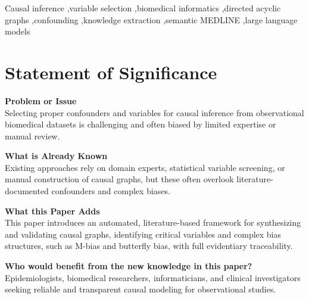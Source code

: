 \documentclass[preprint,12pt,numbers,sort&compress]{elsarticle}
\begin{document}
\begin{frontmatter}
\begin{abstract}
\textbf{Conclusions:} CausalKnowledgeTrace provides a scalable, evidence-based approach to causal graph construction that systematically identifies confounders and bias structures often missed by conventional approaches. The Python-Django architecture enables both standalone analysis and integration into larger computational workflows, representing a significant advance in computational support for causal inference in biomedical research.
\end{abstract}

\begin{keyword}
Causal inference \sep variable selection \sep biomedical informatics \sep directed acyclic graphs \sep confounding \sep knowledge extraction \sep semantic MEDLINE \sep large language models

\end{keyword}

\end{frontmatter}


\section*{Statement of Significance}

\noindent\textbf{Problem or Issue}\\
Selecting proper confounders and variables for causal inference from observational biomedical datasets is challenging and often biased by limited expertise or manual review.

\noindent\textbf{What is Already Known}\\
Existing approaches rely on domain experts, statistical variable screening, or manual construction of causal graphs, but these often overlook literature-documented confounders and complex biases.

\noindent\textbf{What this Paper Adds}\\
This paper introduces an automated, literature-based framework for synthesizing and validating causal graphs, identifying critical variables and complex bias structures, such as M-bias and butterfly bias, with full evidentiary traceability.

\noindent\textbf{Who would benefit from the new knowledge in this paper?}\\
Epidemiologists, biomedical researchers, informaticians, and clinical investigators seeking reliable and transparent causal modeling for observational studies.
\end{document}
